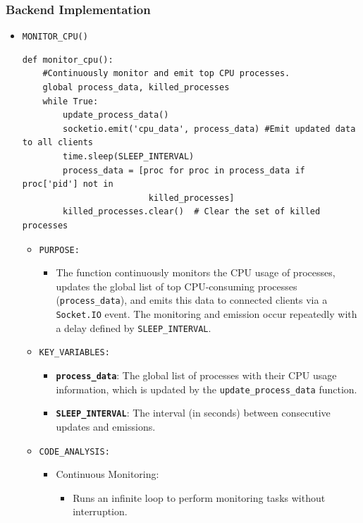 \documentclass[12pt]{article}
\begin{document}
\subsubsection{Backend Implementation}
\begin{itemize}
    \item \texttt{MONITOR\_CPU()}
    \begin{verbatim}
def monitor_cpu():
    #Continuously monitor and emit top CPU processes.
    global process_data, killed_processes
    while True:
        update_process_data()
        socketio.emit('cpu_data', process_data) #Emit updated data to all clients
        time.sleep(SLEEP_INTERVAL)
        process_data = [proc for proc in process_data if proc['pid'] not in 
                         killed_processes]
        killed_processes.clear()  # Clear the set of killed processes
\end{verbatim}

\begin{itemize}
    \item \texttt{PURPOSE:}
    \begin{itemize}
        \item The function continuously monitors the CPU usage of processes, updates the global list of top CPU-consuming processes (\texttt{process\_data}), and emits this data to connected clients via a \texttt{Socket.IO} event. The monitoring and emission occur repeatedly with a delay defined by \texttt{SLEEP\_INTERVAL}.
    \end{itemize}
    
   \item \texttt{KEY\_VARIABLES:}
   \begin{itemize}
    \item \textbf{\texttt{process\_data}}: The global list of processes with their CPU usage information, which is updated by the \texttt{update\_process\_data} function.
    \item \textbf{\texttt{SLEEP\_INTERVAL}}: The interval (in seconds) between consecutive updates and emissions.
\end{itemize}
   \item \texttt{CODE\_ANALYSIS:}
   \begin{itemize}
       \item Continuous Monitoring:
       \begin{itemize}
    \item Runs an infinite loop to perform monitoring tasks without interruption.
\end{itemize}


\end{itemize}
\end{itemize}
\end{itemize}
\end{document}
